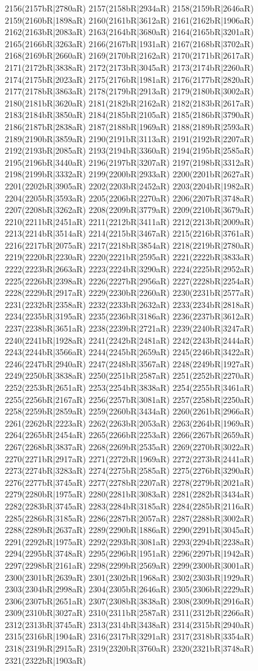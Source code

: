 2156(2157bR|2780aR) 2157(2158bR|2934aR) 2158(2159bR|2646aR) 2159(2160bR|1898aR) 2160(2161bR|3612aR) 2161(2162bR|1906aR) 2162(2163bR|2083aR) 2163(2164bR|3680aR) 2164(2165bR|3201aR) 2165(2166bR|3263aR) 2166(2167bR|1931aR) 2167(2168bR|3702aR) 2168(2169bR|2660aR) 2169(2170bR|2162aR) 2170(2171bR|2617aR) 2171(2172bR|3838aR) 2172(2173bR|3045aR) 2173(2174bR|2260aR) 2174(2175bR|2023aR) 2175(2176bR|1981aR) 2176(2177bR|2820aR) 2177(2178bR|3863aR) 2178(2179bR|2913aR) 2179(2180bR|3002aR) 2180(2181bR|3620aR) 2181(2182bR|2162aR) 2182(2183bR|2617aR) 2183(2184bR|3850aR) 2184(2185bR|2105aR) 2185(2186bR|3790aR) 2186(2187bR|2838aR) 2187(2188bR|1969aR) 2188(2189bR|2593aR) 2189(2190bR|3859aR) 2190(2191bR|3113aR) 2191(2192bR|2207aR) 2192(2193bR|2085aR) 2193(2194bR|3360aR) 2194(2195bR|2585aR) 2195(2196bR|3440aR) 2196(2197bR|3207aR) 2197(2198bR|3312aR) 2198(2199bR|3332aR) 2199(2200bR|2933aR) 2200(2201bR|2627aR) 2201(2202bR|3905aR) 2202(2203bR|2452aR) 2203(2204bR|1982aR) 2204(2205bR|3593aR) 2205(2206bR|2270aR) 2206(2207bR|3748aR) 2207(2208bR|3262aR) 2208(2209bR|3779aR) 2209(2210bR|3679aR) 2210(2211bR|2451aR) 2211(2212bR|3411aR) 2212(2213bR|2009aR) 2213(2214bR|3514aR) 2214(2215bR|3467aR) 2215(2216bR|3761aR) 2216(2217bR|2075aR) 2217(2218bR|3854aR) 2218(2219bR|2780aR) 2219(2220bR|2230aR) 2220(2221bR|2595aR) 2221(2222bR|3833aR) 2222(2223bR|2663aR) 2223(2224bR|3290aR) 2224(2225bR|2952aR) 2225(2226bR|2398aR) 2226(2227bR|2956aR) 2227(2228bR|2254aR) 2228(2229bR|2917aR) 2229(2230bR|2260aR) 2230(2231bR|2577aR) 2231(2232bR|2358aR) 2232(2233bR|2632aR) 2233(2234bR|2818aR) 2234(2235bR|3195aR) 2235(2236bR|3186aR) 2236(2237bR|3612aR) 2237(2238bR|3651aR) 2238(2239bR|2721aR) 2239(2240bR|3247aR) 2240(2241bR|1928aR) 2241(2242bR|2481aR) 2242(2243bR|2444aR) 2243(2244bR|3566aR) 2244(2245bR|2659aR) 2245(2246bR|3422aR) 2246(2247bR|2940aR) 2247(2248bR|3567aR) 2248(2249bR|1927aR) 2249(2250bR|3838aR) 2250(2251bR|2587aR) 2251(2252bR|2270aR) 2252(2253bR|2651aR) 2253(2254bR|3838aR) 2254(2255bR|3461aR) 2255(2256bR|2167aR) 2256(2257bR|3081aR) 2257(2258bR|2250aR) 2258(2259bR|2859aR) 2259(2260bR|3434aR) 2260(2261bR|2966aR) 2261(2262bR|2223aR) 2262(2263bR|2053aR) 2263(2264bR|1969aR) 2264(2265bR|2454aR) 2265(2266bR|2253aR) 2266(2267bR|2659aR) 2267(2268bR|3837aR) 2268(2269bR|2535aR) 2269(2270bR|3022aR) 2270(2271bR|2917aR) 2271(2272bR|1969aR) 2272(2273bR|2441aR) 2273(2274bR|3283aR) 2274(2275bR|2585aR) 2275(2276bR|3290aR) 2276(2277bR|3745aR) 2277(2278bR|2207aR) 2278(2279bR|2021aR) 2279(2280bR|1975aR) 2280(2281bR|3083aR) 2281(2282bR|3434aR) 2282(2283bR|3745aR) 2283(2284bR|3185aR) 2284(2285bR|2116aR) 2285(2286bR|3185aR) 2286(2287bR|2057aR) 2287(2288bR|3002aR) 2288(2289bR|2637aR) 2289(2290bR|1886aR) 2290(2291bR|3045aR) 2291(2292bR|1975aR) 2292(2293bR|3081aR) 2293(2294bR|2238aR) 2294(2295bR|3748aR) 2295(2296bR|1951aR) 2296(2297bR|1942aR) 2297(2298bR|2161aR) 2298(2299bR|2569aR) 2299(2300bR|3001aR) 2300(2301bR|2639aR) 2301(2302bR|1968aR) 2302(2303bR|1929aR) 2303(2304bR|2998aR) 2304(2305bR|2646aR) 2305(2306bR|2229aR) 2306(2307bR|2651aR) 2307(2308bR|3838aR) 2308(2309bR|2916aR) 2309(2310bR|3027aR) 2310(2311bR|2587aR) 2311(2312bR|2266aR) 2312(2313bR|3745aR) 2313(2314bR|3438aR) 2314(2315bR|2940aR) 2315(2316bR|1904aR) 2316(2317bR|3291aR) 2317(2318bR|3354aR) 2318(2319bR|2915aR) 2319(2320bR|3760aR) 2320(2321bR|3748aR) 2321(2322bR|1903aR) 